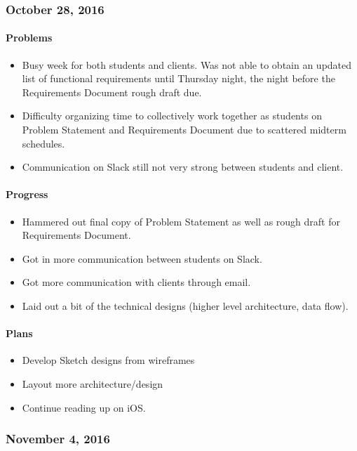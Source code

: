 \subsubsection{October 28, 2016}\label{section}
\paragraph{Problems}\label{problems}
\begin{itemize}
\tightlist
\item
  Busy week for both students and clients. Was not able to obtain an
  updated list of functional requirements until Thursday night, the
  night before the Requirements Document rough draft due.
\item
  Difficulty organizing time to collectively work together as students
  on Problem Statement and Requirements Document due to scattered
  midterm schedules.
\item
  Communication on Slack still not very strong between students and
  client.
\end{itemize}
\paragraph{Progress}\label{progress}
\begin{itemize}
\tightlist
\item
  Hammered out final copy of Problem Statement as well as rough draft
  for Requirements Document.
\item
  Got in more communication between students on Slack.
\item
  Got more communication with clients through email.
\item
  Laid out a bit of the technical designs (higher level architecture,
  data flow).
\end{itemize}
\paragraph{Plans}\label{plans}
\begin{itemize}
\tightlist
\item
  Develop Sketch designs from wireframes
\item
  Layout more architecture/design
\item
  Continue reading up on iOS.
\end{itemize}

\subsubsection{November 4, 2016}\label{section}
